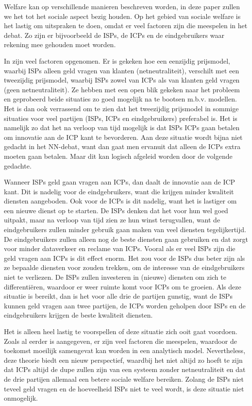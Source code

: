 Welfare kan op verschillende manieren beschreven worden, in deze paper zullen we het tot het sociale aspect bezig houden. Op het gebied van sociale welfare is het lastig om uitspraken te doen, omdat er veel factoren zijn die meespelen in het debat. Zo zijn er bijvoorbeeld de \acp{ISP}, de \acp{ICP} en de eindgebruikers waar rekening mee gehouden moet worden.

In \cite{musacchio2009} zijn veel factoren opgenomen. Er is gekeken hoe een eenzijdig prijsmodel, waarbij \acp{ISP} alleen geld vragen van klanten (netneutraliteit), verschilt met een tweezijdig prijsmodel, waarbij \acp{ISP} zowel van \acp{ICP} als van klanten geld vragen (geen netneutraliteit). Ze hebben met een open blik gekeken naar het probleem en geprobeerd beide situaties zo goed mogelijk na te bootsen m.b.v. modellen. Het is dan ook verrassend om te zien dat het tweezijdig prijsmodel in sommige situaties voor veel partijen (\acp{ISP}, \acp{ICP} en eindgebruikers) preferabel is. Het is namelijk zo dat het na verloop van tijd mogelijk is dat \acp{ISP} \acp{ICP} gaan betalen om innovatie aan de \ac{ICP} kant te bevorderen. Aan deze situatie wordt bijna niet gedacht in het NN-debat, want dan gaat men ervanuit dat alleen de \acp{ICP} extra moeten gaan betalen. Maar dit kan logisch afgeleid worden door de volgende gedachte.

Wanneer \acp{ISP} geld gaan vragen aan \acp{ICP}, dan daalt de innovatie aan de \ac{ICP} kant. Dit is nadelig voor de eindgebruikers, want die krijgen minder kwaliteit diensten aangeboden. Ook voor de \acp{ICP} is dit nadelig, want het is lastiger om een nieuwe dienst op te starten. De \acp{ISP} denken dat het voor hun wel goed uitpakt, maar na verloop van tijd zien ze hun winst terugvallen, want de eindgebruikers zullen minder gebruik gaan maken van veel diensten tegelijkertijd. De eindgebruikers zullen alleen nog de beste diensten gaan gebruiken en dat zorgt voor minder dataverkeer en reclame van \acp{ICP}. Vooral als er veel \acp{ISP} zijn die geld vragen aan \acp{ICP} is dit effect enorm. Het zou voor de \acp{ISP} dus beter zijn als ze bepaalde diensten voor zouden trekken, om de interesse van de eindgebruikers niet te verliezen. De \acp{ISP} zullen investeren in (nieuwe) diensten om zich te differenti{\"e}ren, waardoor er weer ruimte komt voor \acp{ICP} om te groeien. Als deze situatie is bereikt, dan is het voor alle drie de partijen gunstig, want de \acp{ISP} kunnen geld vragen aan twee partijen, de \acp{ICP} worden geholpen door \acp{ISP} en de eindgebruikers krijgen de beste kwaliteit diensten.

Het is alleen heel lastig te voorspellen of deze situatie zich ooit gaat voordoen. Zoals al eerder is aangegeven, er zijn veel factoren die meespelen, waardoor de toekomst moeilijk samengevat kan worden in een analytisch model. Nevertheless, deze theorie biedt een nieuw perspectief, waardbij het niet altijd zo hoeft te zijn dat \acp{ICP} altijd de dupe zullen zijn van een systeem zonder netneutraliteit en dat de drie partijen allemaal een betere sociale welfare bereiken. Zolang de \acp{ISP} niet teveel geld vragen en de hoeveelheid \acp{ISP} niet te veel wordt, is deze situatie niet onmogelijk.